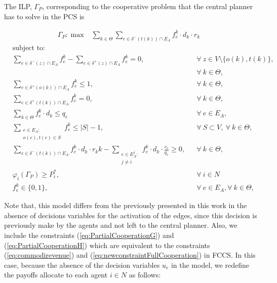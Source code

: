 \documentclass{article}
\begin{document}
The ILP, $\Gamma_P$, corresponding to the cooperative problem that the central planner has to solve in the PCS is

\begin{align}
        &  \Gamma_P: \max  & \sum_{k \in \Theta} \sum_{e \in \delta^-(t(k))\cap E_A}  f_e^k \cdot d_k \cdot r_k  &&   \label{eq:PartialCooperationA} 
    \end{align}
    \begin{align}
        & \text{subject to:}       && \nonumber\\
        & \sum_{e \in \delta^-(z)\cap E_A} f_e^k-\sum_{e \in \delta^+(z)\cap E_A} f_{e}^k = 0,            \quad && \forall\ z\in V\setminus\{o(k),t(k)\},\nonumber\\
& && \forall\ k\in\Theta,  \label{eq:PartialCooperationB}\\[1em]
& \sum_{e \in \delta^+(o(k))\cap E_A} f_e^k \leq 1,  && \forall\ k\in \Theta, \label{eq:PartialCooperationC} \\
& \sum_{e \in \delta^+(t(k))\cap E_A} f_e^k = 0,  && \forall\ k\in \Theta, \label{eq:PartialCooperationD} \\
 & \sum_{k \in \Theta} f_e^k\cdot d_k \leq q_e     && \forall\ e \in E_A, \label{eq:PartialCooperationE}  \\
 & \sum_{\substack{e \in E_A\colon \\ o(e),t(e) \in S}} f_e^k  \leq |S| -1,    && \forall\ S \subset V,\ \forall\ k \in \Theta, \label{eq:PartialCooperationF}\\
&\sum_{e \in \delta^-(t(k))\cap E_A}  f_e^k \cdot d_k \cdot r_kk
 -\sum_{\substack{e \in E_A^j\colon \\ j\not = i}} f_e^k \cdot d_k \cdot \frac{c_e}{q_e}\geq 0, && \forall\ k \in \Theta, \label{eq:PartialCooperationG} \\
& \varphi_i(\Gamma_P)   \geq P_i^*,     && \forall\ i\in N \label{eq:PartialCooperationH}\\
 & f_e^k  \in \{0,1\},    && \forall\ e \in E_A, \forall\ k \in \Theta, \label{eq:PartialCooperationI}
    \end{align}

Note that, this model differs from the previously presented in this work in the absence of decisions variables for the activation of the edges, since this decision is previously make by the agents and not left to the central planner. Also, we include the constraints (\ref{eq:PartialCooperationG}) and (\ref{eq:PartialCooperationH})
which are equivalent to the constraints (\ref{eq:commodirevenue}) and (\ref{eq:newconstraintFullCooperation}) in FCCS. In this case, because the absence of the decision variables $u_e$ in the model, we redefine the payoffs allocate to each agent $i\in N$ as follows:
\end{document}
